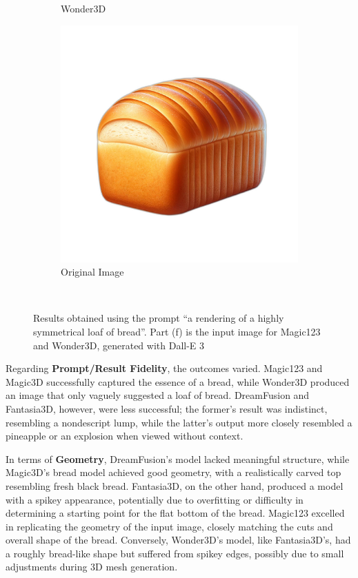 \begin{figure}[ht]
\begin{subfigure}[b]{0.23\textwidth}
        \caption{Wonder3D}
        \vspace{0.1cm}
    \end{subfigure}
    \begin{subfigure}[b]{0.23\textwidth}
        \centering
        \includegraphics[width=\textwidth]{etc/Images/bread.png}
        \caption{Original Image}
        \vspace{0.1cm}
    \end{subfigure}
    \caption{Results obtained using the prompt ``a rendering of a highly symmetrical loaf of bread''. Part (f) is the input image for Magic123 and Wonder3D, generated with Dall-E 3}~\label{fig:resultBread}
\end{figure}

Regarding \textbf{Prompt/Result Fidelity}, the outcomes varied. Magic123 and Magic3D successfully captured the essence of a bread, while Wonder3D produced an image that only vaguely suggested a loaf of bread. DreamFusion and Fantasia3D, however, were less successful; the former's result was indistinct, resembling a nondescript lump, while the latter's output more closely resembled a pineapple or an explosion when viewed without context.

In terms of \textbf{Geometry}, DreamFusion's model lacked meaningful structure, while Magic3D's bread model achieved good geometry, with a realistically carved top resembling fresh black bread. Fantasia3D, on the other hand, produced a model with a spikey appearance, potentially due to overfitting or difficulty in determining a starting point for the flat bottom of the bread. Magic123 excelled in replicating the geometry of the input image, closely matching the cuts and overall shape of the bread. Conversely, Wonder3D's model, like Fantasia3D's, had a roughly bread-like shape but suffered from spikey edges, possibly due to small adjustments during 3D mesh generation.

